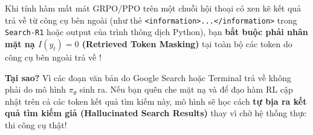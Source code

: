 \begin{engtakeaway}
Khi tính hàm mất mát GRPO/PPO trên một chuỗi hội thoại có xen kẽ kết quả trả về từ công cụ bên ngoài (như thẻ \texttt{<information>...</information>} trong \texttt{Search-R1} hoặc output của trình thông dịch Python), bạn \textbf{bắt buộc phải nhân mặt nạ $I(y_t) = 0$ (Retrieved Token Masking)} tại toàn bộ các token do công cụ bên ngoài trả về \citep{jin2025searchr1}!

\textbf{Tại sao?} Vì các đoạn văn bản do Google Search hoặc Terminal trả về không phải do mô hình $\pi_\theta$ sinh ra. Nếu bạn quên che mặt nạ và để đạo hàm RL cập nhật trên cả các token kết quả tìm kiếm này, mô hình sẽ học cách \textbf{tự bịa ra kết quả tìm kiếm giả (Hallucinated Search Results)} thay vì chờ hệ thống thực thi công cụ thật!
\end{engtakeaway}
